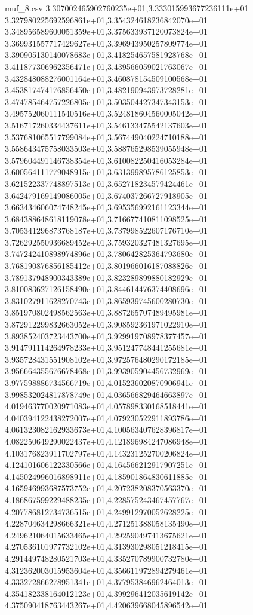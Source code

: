 \begin{filecontents*}{muf_8.csv}
3.307002465902760235e+01,3.333015993677236111e+01
3.327980225692596861e+01,3.354324618236842070e+01
3.348956589600051359e+01,3.375633937120073824e+01
3.369931557717429627e+01,3.396943950257809774e+01
3.390905130140078683e+01,3.418254657581928768e+01
3.411877306962356471e+01,3.439566059021763067e+01
3.432848088276001164e+01,3.460878154509100568e+01
3.453817474176856450e+01,3.482190943973728281e+01
3.474785464757226805e+01,3.503504427347343153e+01
3.495752060111540516e+01,3.524818604560005042e+01
3.516717260334437611e+01,3.546133475542137603e+01
3.537681065517799084e+01,3.567449040224710188e+01
3.558643475758033503e+01,3.588765298539055948e+01
3.579604491146738354e+01,3.610082250416053284e+01
3.600564111779048915e+01,3.631399895786125853e+01
3.621522337748897513e+01,3.652718234579424461e+01
3.642479169149086005e+01,3.674037266727918905e+01
3.663434606074748245e+01,3.695356992161123344e+01
3.684388648618119078e+01,3.716677410811098525e+01
3.705341296873768187e+01,3.737998522607176710e+01
3.726292550936689452e+01,3.759320327481327695e+01
3.747242410898974896e+01,3.780642825364793680e+01
3.768190876856185412e+01,3.801966016187088826e+01
3.789137948900343389e+01,3.823289899880182929e+01
3.810083627126158490e+01,3.844614476374408696e+01
3.831027911628270743e+01,3.865939745600280730e+01
3.851970802498562563e+01,3.887265707489495981e+01
3.872912299832663052e+01,3.908592361971022910e+01
3.893852403723443700e+01,3.929919708978377457e+01
3.914791114264978233e+01,3.951247748441255681e+01
3.935728431551908102e+01,3.972576480290172185e+01
3.956664355676678468e+01,3.993905904456732969e+01
3.977598886734566719e+01,4.015236020870906941e+01
3.998532024817878749e+01,4.036566829464663897e+01
4.019463770020971083e+01,4.057898330168518441e+01
4.040394122438272007e+01,4.079230522911893786e+01
4.061323082162933673e+01,4.100563407628396817e+01
4.082250649290022437e+01,4.121896984247086948e+01
4.103176823911702797e+01,4.143231252700206824e+01
4.124101606122330566e+01,4.164566212917907251e+01
4.145024996016898911e+01,4.185901864830611885e+01
4.165946993687573752e+01,4.207238208370563370e+01
4.186867599229488235e+01,4.228575243467457767e+01
4.207786812734736515e+01,4.249912970052628225e+01
4.228704634298666321e+01,4.271251388058135490e+01
4.249621064015633465e+01,4.292590497413675621e+01
4.270536101977732102e+01,4.313930298051218415e+01
4.291449748280521703e+01,4.335270789900732780e+01
4.312362003015953604e+01,4.356611972894279461e+01
4.333272866278951341e+01,4.377953846962464013e+01
4.354182338164012123e+01,4.399296412035619142e+01
4.375090418763443267e+01,4.420639668045896542e+01

\end{filecontents*}
